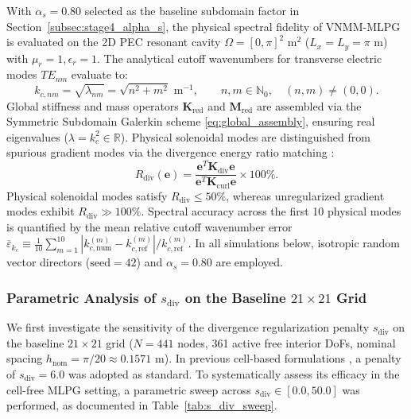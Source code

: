 \documentclass[VANCOUVER]{USG}
\begin{document}
With $\alpha_s = 0.80$ selected as the baseline subdomain factor in Section~\ref{subsec:stage4_alpha_s}, the physical spectral fidelity of VNMM-MLPG is evaluated on the 2D PEC resonant cavity $\Omega = [0, \pi]^2\text{ m}^2$ ($L_x = L_y = \pi\text{ m}$) with $\mu_r = 1, \epsilon_r = 1$. The analytical cutoff wavenumbers for transverse electric modes $TE_{nm}$ evaluate to:
\begin{equation}
    k_{c, nm} = \sqrt{\lambda_{nm}} = \sqrt{n^2 + m^2}\text{ m}^{-1}, \qquad n, m \in \mathbb{N}_0, \quad (n, m) \ne (0, 0).
    \label{eq:analytical_cavity_kc}
\end{equation}
Global stiffness and mass operators $\mathbf{K}_{\mathrm{red}}$ and $\mathbf{M}_{\mathrm{red}}$ are assembled via the Symmetric Subdomain Galerkin scheme \eqref{eq:global_assembly}, ensuring real eigenvalues ($\lambda = k_c^2 \in \mathbb{R}$). Physical solenoidal modes are distinguished from spurious gradient modes via the divergence energy ratio matching \cite{stable_vnmm2d_2026}:
\begin{equation}
    R_{\mathrm{div}}(\mathbf{e}) = \frac{\mathbf{e}^T \mathbf{K}_{\mathrm{div}} \mathbf{e}}{\mathbf{e}^T \mathbf{K}_{\mathrm{curl}} \mathbf{e}} \times 100\%.
    \label{eq:R_div_definition}
\end{equation}
Physical solenoidal modes satisfy $R_{\mathrm{div}} \le 50\%$, whereas unregularized gradient modes exhibit $R_{\mathrm{div}} \gg 100\%$. Spectral accuracy across the first 10 physical modes is quantified by the mean relative cutoff wavenumber error $\overline{\varepsilon}_{k_c} \equiv \frac{1}{10}\sum_{m=1}^{10} |k_{c, \mathrm{num}}^{(m)} - k_{c, \mathrm{ref}}^{(m)}| / k_{c, \mathrm{ref}}^{(m)}$. In all simulations below, isotropic random vector directors ($\text{seed}=42$) and $\alpha_s = 0.80$ are employed.

\subsubsection{Parametric Analysis of $s_{\mathrm{div}}$ on the Baseline $21\times 21$ Grid}
\label{subsubsec:s_div_sweep}

We first investigate the sensitivity of the divergence regularization penalty $s_{\mathrm{div}}$ on the baseline $21 \times 21$ grid ($N = 441$ nodes, 361 active free interior DoFs, nominal spacing $h_{\mathrm{nom}} = \pi/20 \approx 0.1571\text{ m}$). In previous cell-based formulations \cite{stable_vnmm2d_2026}, a penalty of $s_{\mathrm{div}} = 6.0$ was adopted as standard. To systematically assess its efficacy in the cell-free MLPG setting, a parametric sweep across $s_{\mathrm{div}} \in [0.0, 50.0]$ was performed, as documented in Table~\ref{tab:s_div_sweep}.
\end{document}

